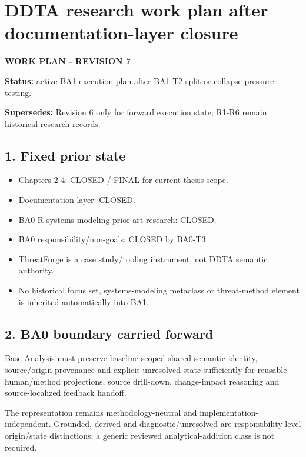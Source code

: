 \documentclass[
  10pt,
]{article}
\author{}
\date{}
\providecommand{\tightlist}{%
  \setlength{\itemsep}{0pt}\setlength{\parskip}{0pt}}
\begin{document}
\section{DDTA research work plan after documentation-layer
closure}\label{ddta-research-work-plan-after-documentation-layer-closure}

\textbf{WORK PLAN - REVISION 7}

\textbf{Status:} active BA1 execution plan after BA1-T2
split-or-collapse pressure testing.

\textbf{Supersedes:} Revision 6 only for forward execution state; R1-R6
remain historical research records.

\subsection{1. Fixed prior state}\label{fixed-prior-state}

\begin{itemize}
\tightlist
\item
  Chapters 2-4: CLOSED / FINAL for current thesis scope.
\item
  Documentation layer: CLOSED.
\item
  BA0-R systems-modeling prior-art research: CLOSED.
\item
  BA0 responsibility/non-goals: CLOSED by BA0-T3.
\item
  ThreatForge is a case study/tooling instrument, not DDTA semantic
  authority.
\item
  No historical focus set, systems-modeling metaclass or threat-method
  element is inherited automatically into BA1.
\end{itemize}

\subsection{2. BA0 boundary carried
forward}\label{ba0-boundary-carried-forward}

Base Analysis must preserve baseline-scoped shared semantic identity,
source/origin provenance and explicit unresolved state sufficiently for
reusable human/method projections, source drill-down, change-impact
reasoning and source-localized feedback handoff.

The representation remains methodology-neutral and
implementation-independent. Grounded, derived and diagnostic/unresolved
are responsibility-level origin/state distinctions; a generic reviewed
analytical-addition class is not required.
\end{document}
